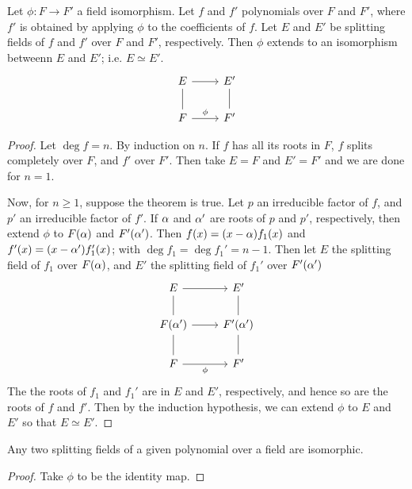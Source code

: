 \begin{theorem}\label{theorem_8.4.3}
  Let $\phi:F \xrightarrow{} F'$ a field isomorphism. Let $f$ and  $f'$
  polynomials over  $F$ and  $F'$, where  $f'$ is obtained by applying  $\phi$
  to the coefficients of  $f$. Let  $E$ and  $E'$ be splitting fields of $f$
  and  $f'$ over $F$ and $F'$, respectively. Then $\phi$ extends to an
  isomorphism betweenn $E$ and $E'$; i.e. $E \simeq E'$.
  \[\begin{tikzcd}
    E & {E'} \\
    F & {F'}
    \arrow[from=1-1, to=1-2]
    \arrow["\phi", from=2-1, to=2-2]
    \arrow[no head, from=1-2, to=2-2]
    \arrow[no head, from=1-1, to=2-1]
  \end{tikzcd}\]
\end{theorem}
\begin{proof}
  Let $\deg{f}=n$. By induction on $n$. If  $f$ has all its roots in $F$, $f$
  splits completely over  $F$, and  $f'$ over  $F'$. Then take  $E=F$ and
  $E'=F'$ and we are done for $n=1$.

  Now, for  $n \geq 1$, suppose the theorem is true. Let $p$ an irreducible
  factor of $f$, and $p'$ an irreducible factor of  $f'$. If  $\alpha$ and  $\alpha'$
  are roots of  $p$ and  $p'$, respectively, then extend $\phi$ to  $F(\alpha)$
  and $F'(\alpha')$. Then $f(x)=(x-\alpha)f_1(x)$ and $f'(x)=(x-\alpha')f_1'(x)$; with
  $\deg{f_1}=\deg{f_1'}=n-1$. Then let $E$ the splitting field of $f_1$ over
  $F(\alpha)$, and $E'$ the splitting field of  $f_1'$ over $F'(\alpha')$
  \[\begin{tikzcd}
    E & {E'} \\
    {F(\alpha')} & {F'(\alpha')} \\
    F & {F'}
    \arrow["\phi"', from=3-1, to=3-2]
    \arrow[from=2-1, to=2-2]
    \arrow[from=1-1, to=1-2]
    \arrow[no head, from=1-1, to=2-1]
    \arrow[no head, from=2-1, to=3-1]
    \arrow[no head, from=1-2, to=2-2]
    \arrow[no head, from=2-2,to=3-2]
  \end{tikzcd}\]
  The the roots of $f_1$ and  $f_1'$ are in  $E$ and  $E'$, respectively, and
  hence so are the roots of $f$ and  $f'$. Then by the induction hypothesis,
  we can extend  $\phi$ to  $E$ and  $E'$ so that  $E \simeq E'$.
\end{proof}
\begin{corollary}
  Any two splitting fields of a given polynomial over a field are isomorphic.
\end{corollary}
\begin{proof}
  Take $\phi$ to be the identity map.
\end{proof}
